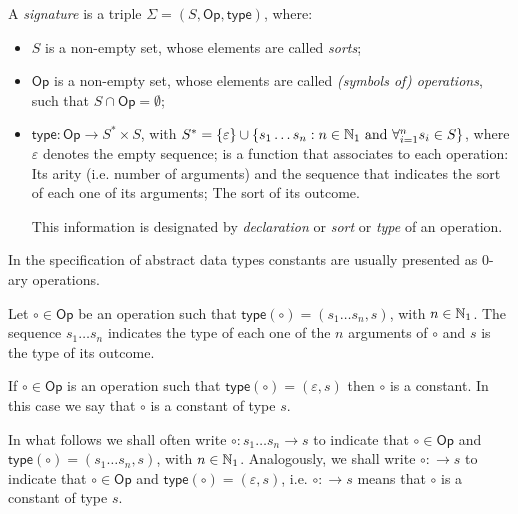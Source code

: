 \begin{definition}
	A \emph{signature} is a triple $\Sigma = (S, \mathsf{Op}, \mathsf{type})$, where:
	\begin{itemize}
		\item $S$ is a non-empty set, whose elements are called \emph{sorts};
		\item $\mathsf{Op}$ is a non-empty set, whose elements are called \emph{(symbols of) operations}, such that $S \cap \mathsf{Op} = \emptyset$;
		\item $\mathsf{type} : \mathsf{Op} \to S^* \times S$, with $S^* = \{ \varepsilon \} \cup \{ s_1 \ldots s_n : n \in \mathbb{N}_1 \text{ and } \forall_{i=1}^n s_i \in S \}$, where $\varepsilon$ denotes the empty sequence; is a function that associates to each operation:
			\subitem Its arity (i.e. number of arguments) and the sequence that indicates the sort of each one of its arguments;
			\subitem The sort of its outcome.

		This information is designated by \emph{declaration} or \emph{sort} or \emph{type} of an operation.
	\end{itemize}
\end{definition}
In the specification of abstract data types constants are usually presented as $0$-ary operations.\par
Let $\circ \in \mathsf{Op}$ be an operation such that $\mathsf{type}(\circ) = (s_1 \ldots s_n, s)$, with $n \in \mathbb{N}_1$. The sequence $s_1 \ldots s_n$ indicates the type of each one of the $n$ arguments of $\circ$ and $s$ is the type of its outcome. \par
If $\circ \in \mathsf{Op}$ is an operation such that $\mathsf{type}(\circ) = ( \varepsilon, s )$ then $\circ$ is a constant. In this case we say that $\circ$ is a constant of type $s$. \par
In what follows we shall often write $\circ : s_1 \ldots s_n \to s$ to indicate that $\circ \in \mathsf{Op}$ and $\mathsf{type}(\circ) = (s_1 \ldots s_n, s)$, with $n \in \mathbb{N}_1$. Analogously, we shall write $\circ : \to s$ to indicate that $\circ \in \mathsf{Op}$ and $\mathsf{type}(\circ) = (\varepsilon, s)$, i.e. $\circ : \to s$ means that $\circ$ is a constant of type $s$.


